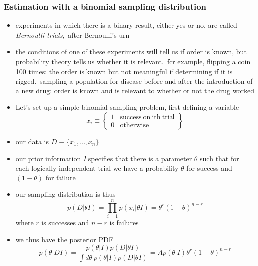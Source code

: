 \documentclass[../jaynes_prob_theory_notes.tex]{subfiles}
\begin{document}
    \subsubsection{Estimation with a binomial sampling distribution}
        \begin{itemize}
            \item experiments in which there is a binary result, either yes or no, are called \textit{Bernoulli trials},\ after Bernoulli's urn
            \item the conditions of one of these experiments will tell us if order is known, but probability theory tells us whether it is relevant.\ for example, flipping a coin 100 times: the order is known but not meaningful if determining if it is rigged.\ sampling a population for disease before and after the introduction of a new drug: order is known and is relevant to whether or not the drug worked
            \item Let's set up a simple binomial sampling problem, first defining a variable
                \begin{equation*}
                    x_i \equiv \left \{ \begin{matrix} 1 & \mathrm{success~on~ith~trial} \\ 0 & \mathrm{otherwise} \end{matrix} \right \}
                \end{equation*}
            \item our data is $D \equiv \{x_{1}, \ldots, x_n \}$
            \item our prior information $I$ specifies that there is a parameter $\theta$ such that for each logically independent trial we have a probability $\theta$ for success and $(1-\theta)$ for failure
            \item our sampling distribution is thus
                \begin{equation*}
                    p(D|{\theta}I) = \prod^{n}_{i=1} p(x_i|{\theta}I) = {\theta}^r{(1-\theta)}^{n-r}
                \end{equation*}
            where $r$ is successes and $n-r$ is failures
            \item we thus have the posterior PDF
                \begin{equation*}
                    p(\theta|DI) = \frac{p(\theta|I)p(D|{\theta}I)}{\int d{\theta}~p(\theta|I)p(D|{\theta}I)} = Ap(\theta|I){\theta}^r{(1-\theta)}^{n-r}
                \end{equation*}

\end{itemize}
\end{document}
